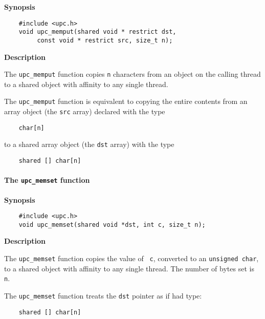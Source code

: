 {\bf Synopsis} 

\npf\vspace{-2.5em}
\begin{verbatim}
    #include <upc.h> 
    void upc_memput(shared void * restrict dst,
         const void * restrict src, size_t n); 
\end{verbatim}

{\bf Description}
 
\np The {\tt upc\_memput} function copies {\tt n} characters from
   an object on the calling thread to a shared object with affinity
   to any single thread.
   
\np The {\tt upc\_memput} function is equivalent to copying the
   entire contents from an array object (the {\tt src} array) declared
   with the type

\begin{verbatim}
    char[n] 
\end{verbatim}

   to a shared array object (the {\tt dst} array) with the type 

\begin{verbatim}
    shared [] char[n] 
\end{verbatim}


\paragraph{The {\tt upc\_memset} function}

{\bf Synopsis}

\npf\vspace{-2.5em}
\begin{verbatim}
    #include <upc.h> 
    void upc_memset(shared void *dst, int c, size_t n); 
\end{verbatim}

{\bf Description}

\np The {\tt upc\_memset} function copies the value of {\tt
   c}, converted to an {\tt unsigned char}, to a shared object with affinity
   to any single thread.  The number of bytes set is {\tt n}.

\np The {\tt upc\_memset} function treats the {\tt dst}
   pointer as if had type:

\begin{verbatim}
    shared [] char[n] 
\end{verbatim}

